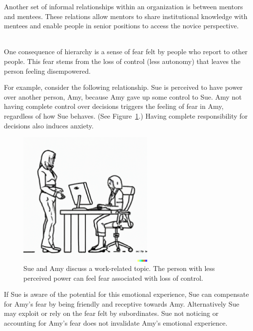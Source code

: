 Another set of informal relationships within an organization is between mentors and mentees. These relations allow mentors to share institutional knowledge with mentees and enable people in senior positions to access the novice perspective. 


\ \\

One consequence of hierarchy is a sense of fear felt by people who report to other people. This fear stems from the loss of control (less autonomy) that leaves the person feeling disempowered. 

For example, consider the following relationship. Sue is perceived to have power over another person, Amy, because Amy gave up some control to Sue. Amy not having complete control over decisions triggers the feeling of fear in Amy, regardless of how Sue behaves. (See Figure~\ref{fig:subordinate_and_supervisor}.) Having complete responsibility for decisions also induces anxiety.

\begin{figure}[H]
    \centering
\includegraphics[width=0.6\textwidth,trim={0 1cm 0 0},clip]{images/female_supervisor_standing_while_talking_to_seated_female_employee_typing_on_keyboard.pdf}
    \caption{Sue and Amy discuss a work-related topic. The person with less perceived power can feel fear associated with loss of control.}
    \label{fig:subordinate_and_supervisor}
\end{figure}



If Sue is aware of the potential for this emotional experience, Sue can compensate for Amy's fear by being friendly and receptive towards Amy. Alternatively Sue may exploit or rely on the fear felt by subordinates. Sue not noticing or accounting for Amy's fear does not invalidate Amy's emotional experience.





